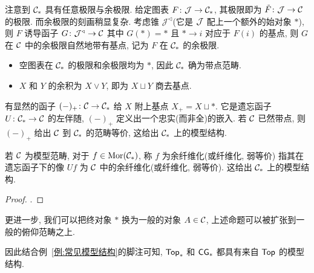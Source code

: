 注意到 $\cal{C}_{*}$ 具有任意极限与余极限. 给定图表 $F\colon \mathcal{J} \to \cal{C}_{*}$, 其极限即为 $\tilde{F}\colon \mathcal{J}\to \cal{C}$ 的极限. 而余极限的刻画稍显复杂. 考虑锥 $\mathcal{J}^{\triangleleft}$(它是 $\cal{J}$ 配上一个额外的始对象 $*$), 则 $F$ 诱导函子 $G \colon \mathcal{J}^{\triangleleft} \to \cal{C}$ 其中 $G(*) = *$ 且 $* \to i$ 对应于 $F(i)$ 的基点, 则 $G$ 在 $\cal{C}$ 中的余极限自然地带有基点, 记为 $F$ 在 $\cal{C}_*$ 的余极限.
\begin{example}
    \begin{itemize}
        \item 空图表在 $\cal{C}_*$ 的极限和余极限均为 $*$, 因此 $\cal{C}_*$ 确为带点范畴.
        \item $X$ 和 $Y$ 的余积为 $X \vee Y$, 即为 $X \sqcup Y$ 商去基点.
    \end{itemize}
\end{example}
有显然的函子 $(-)_+\colon \cal{C} \to C_*$ 给 $X$ 附上基点 $X_+ = X \sqcup *$. 它是遗忘函子 $U \colon \cal{C}_* \to C$ 的左伴随, $(-)_+$ 定义出一个忠实(而非全)的嵌入. 若 $\cal{C}$ 已然带点, 则 $(-)_+$ 给出 $\cal{C}$ 到 $\cal{C}_*$ 的范畴等价, 这给出 $\cal{C}_*$ 上的模型结构.
\begin{proposition}
    若 $\cal{C}$ 为模型范畴, 对于 $f\in \operatorname{Mor}(\cal{C}_*)$, 称 $f$ 为余纤维化(或纤维化, 弱等价) 指其在遗忘函子下的像 $Uf$ 为 $\cal{C}$ 中的余纤维化(或纤维化, 弱等价). 这给出 $\cal{C}_*$ 上的模型结构.
\end{proposition}
\begin{proof}
    \cite[Proposition 1.1.8.]{Hovey}.
\end{proof}
更进一步, 我们可以把终对象 $*$ 换为一般的对象 $A\in\cal{C}$, 上述命题可以被扩张到一般的俯仰范畴之上.
\begin{remark}
    因此结合例~\ref{例:常见模型结构}的脚注可知, $\mathsf{Top}_*$ 和 $\mathsf{CG}_*$ 都具有来自 $\mathsf{Top}$ 的模型结构. 
\end{remark}
